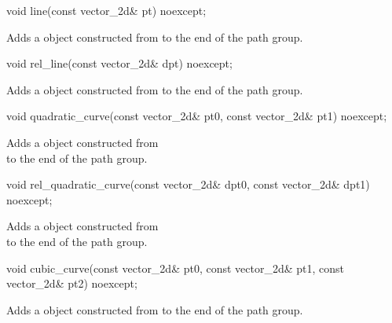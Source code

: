 %
\begin{itemdecl}
void line(const vector_2d& pt) noexcept;
\end{itemdecl}
\begin{itemdescr}
\pnum
Adds a  object constructed from  to the end of the path group.
\end{itemdescr}

%
\begin{itemdecl}
void rel_line(const vector_2d& dpt) noexcept;
\end{itemdecl}
\begin{itemdescr}
\pnum
\effects
Adds a  object constructed from  to the end of the path group.
\end{itemdescr}

%
\begin{itemdecl}
void quadratic_curve(const vector_2d& pt0, const vector_2d& pt1) noexcept;
\end{itemdecl}
\begin{itemdescr}
\pnum
\effects
Adds a  object constructed from\\  to the end of the path group.
\end{itemdescr}

%
\begin{itemdecl}
void rel_quadratic_curve(const vector_2d& dpt0, const vector_2d& dpt1)
  noexcept;
\end{itemdecl}
\begin{itemdescr}
\pnum
\effects
Adds a  object constructed from\\  to the end of the path group.
\end{itemdescr}

%
\begin{itemdecl}
void cubic_curve(const vector_2d& pt0, const vector_2d& pt1,
  const vector_2d& pt2) noexcept;
\end{itemdecl}
\begin{itemdescr}
\pnum
\effects
\pnum
Adds a  object constructed from  to the end of the path group.
\end{itemdescr}

